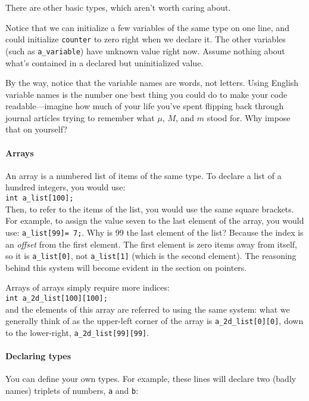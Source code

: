 \documentclass[12pt]{article}
\makeatletter
\def\ind#1{\index{#1}#1}
\def\ttindex#1{\index{#1@{\tt #1}}}
\makeatother
\begin{document}
There are other basic types, which aren't worth caring about.

Notice that we can initialize a few variables of the same type on one
line, and could initialize {\tt counter} to zero right when we declare it. The other
variables (such as {\tt a\_variable}) have unknown value right now. Assume nothing about
what's contained in a declared but uninitialized value.

By the way, notice that the variable names are words, not letters. Using
English variable names is the number one best thing you could do to make your code
readable---imagine how much of your life you've spent flipping back
through journal articles trying to remember what $\mu$, $M$, and $m$
stood for. Why impose that on yourself?

\paragraph{Arrays} An \ind{array} is a numbered list of items of the same type. To declare a list of a hundred
integers, you would use:\\
{\tt int a\_list[100];}\\
Then, to refer to the items of the list, you would use the same square brackets. For example, to assign
the value seven to the last element of the array, you would use: {\tt a\_list[99]= 7;}. Why is 99 the last
element of the list? Because the index is an {\sl offset} from the first element. The first element is
zero items away from itself, so it is {\tt a\_list[0]}, not {\tt a\_list[1]} (which is the second element).
The reasoning behind this system will become evident in the section on pointers.

Arrays of arrays simply require more indices:\\
{\tt int a\_2d\_list[100][100];}\\
and the elements of this array are referred to using the same system: what we generally think of as the
upper-left corner of the array is {\tt a\_2d\_list[0][0]}, down to the lower-right, {\tt a\_2d\_list[99][99]}.


\paragraph{Declaring types}\ttindex{typedef}  
You can define your own
types. For example, these lines will declare two (badly names) triplets
of numbers, {\tt a} and {\tt b}:
\end{document}
